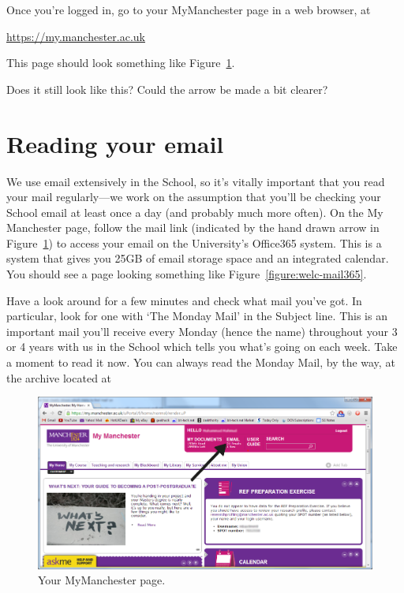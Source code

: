 Once you're logged in, go to your MyManchester page in a web browser, at

\url{https://my.manchester.ac.uk}

This page should look something like Figure~\ref{figure:welc-mymanchester}.

\begin{demonote}
Does it still look like this? Could the arrow be made a bit clearer?  
\end{demonote}
\section{Reading your email}

We use email extensively in the School, so it's vitally important that
you read your mail regularly---we work on the assumption that you'll be checking your School email at least once a day (and probably much
more often). On the My Manchester page, follow the mail link (indicated by the hand drawn arrow  in
Figure~\ref{figure:welc-mymanchester}) to access your email on the
University's Office365 system. This is a system that
gives you 25GB of email storage space and an integrated calendar. You should
see a page looking something like Figure~\ref{figure:welc-mail365}.

Have a look around for a few minutes and check what mail you've
got. In particular, look for one with `The Monday Mail' in the
Subject line. This is an important mail you'll receive every Monday
(hence the name) throughout your 3 or 4 years with us in the
School which  tells you what's going on each week. Take a moment to read it now. You can always read the Monday Mail, by the way, at the archive located at\\  

\begin{figure}
\centerline{\includegraphics[width=15cm]{images/hamza-email-link2.png}}
\caption{Your MyManchester page.}
\label{figure:welc-mymanchester}
\end{figure}


